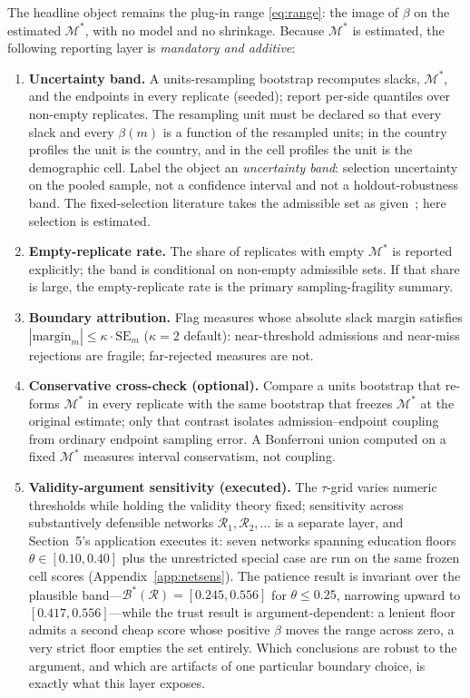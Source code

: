 \documentclass[10pt,letterpaper]{article}
\newcommand{\M}{\ensuremath{\mathcal{M}}}
\newcommand{\Rset}{\mathcal{R}}
\newcommand{\Bset}{\mathcal{B}}
\begin{document}
The headline object remains the plug-in range \eqref{eq:range}: the image of $\beta$ on the estimated $\M^*$, with no model and no shrinkage.
Because $\M^*$ is estimated, the following reporting layer is \emph{mandatory and additive}:
\begin{enumerate}[label=(\roman*)]
\item \textbf{Uncertainty band.}
A units-resampling bootstrap recomputes slacks, $\M^*$, and the endpoints in every replicate (seeded); report per-side quantiles over non-empty replicates.
The resampling unit must be declared so that every slack and every $\beta(m)$ is a function of the resampled units; in the country profiles the unit is the country, and in the cell profiles the unit is the demographic cell.
Label the object an \emph{uncertainty band}: selection uncertainty on the pooled sample, not a confidence interval and not a holdout-robustness band.
The fixed-selection literature takes the admissible set as given~\cite{imbensmanski2004,stoye2009}; here selection is estimated.
\item \textbf{Empty-replicate rate.}
The share of replicates with empty $\M^*$ is reported explicitly; the band is conditional on non-empty admissible sets.
If that share is large, the empty-replicate rate is the primary sampling-fragility summary.
\item \textbf{Boundary attribution.}
Flag measures whose absolute slack margin satisfies $|\mathrm{margin}_m|\le\kappa\cdot\mathrm{SE}_m$ ($\kappa=2$ default): near-threshold admissions and near-miss rejections are fragile; far-rejected measures are not.
\item \textbf{Conservative cross-check (optional).}
Compare a units bootstrap that re-forms $\M^*$ in every replicate with the same bootstrap that freezes $\M^*$ at the original estimate; only that contrast isolates admission--endpoint coupling from ordinary endpoint sampling error.
A Bonferroni union computed on a fixed $\M^*$ measures interval conservatism, not coupling.
\item \textbf{Validity-argument sensitivity (executed).}
The $\tau$-grid varies numeric thresholds while holding the validity theory fixed; sensitivity across substantively defensible networks $\Rset_1,\Rset_2,\ldots$ is a separate layer, and Section~5's application executes it: seven networks spanning education floors $\theta\in[0.10,0.40]$ plus the unrestricted special case are run on the same frozen cell scores (Appendix~\ref{app:netsens}).
The patience result is invariant over the plausible band---$\Bset^*(\Rset)=[0.245,0.556]$ for $\theta\le 0.25$, narrowing upward to $[0.417,0.556]$---while the trust result is argument-dependent: a lenient floor admits a second cheap score whose positive $\beta$ moves the range across zero, a very strict floor empties the set entirely.
Which conclusions are robust to the argument, and which are artifacts of one particular boundary choice, is exactly what this layer exposes.
\end{enumerate}
\end{document}

